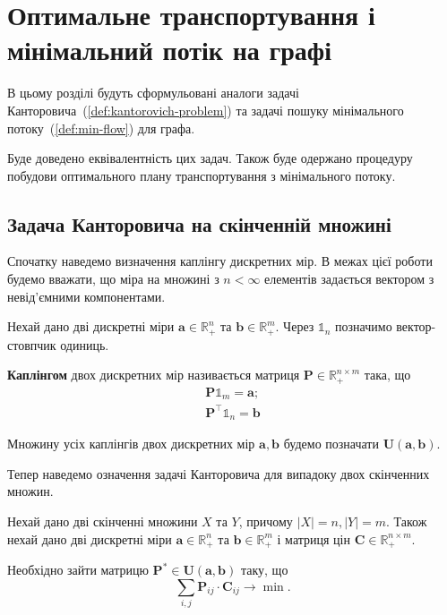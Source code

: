 \chapter{Оптимальне транспортування і мінімальний потік на графі}
\label{chap:graph}

В цьому розділі будуть сформульовані аналоги задачі Канторовича~(\ref{def:kantorovich-problem})
та задачі пошуку мінімального потоку~(\ref{def:min-flow}) для графа.

Буде доведено еквівалентність цих задач. Також буде одержано процедуру побудови
оптимального плану транспортування з мінімального потоку.

\section{Задача Канторовича на скінченній множині}
Спочатку наведемо визначення каплінгу дискретних мір. В межах цієї роботи будемо вважати,
що міра на множині з $n < \infty$ елементів задається вектором з невід'ємними компонентами.

\begin{definition}
    Нехай дано дві дискретні міри $\mathbf a \in \mathbb{R}_+^n$ та $\mathbf b \in \mathbb{R}_+^m$. Через
    $\mathbb{1}_n$ позначимо вектор-стовпчик одиниць.

    \textbf{Каплінгом} двох дискретних мір називається матриця $\mathbf{P} \in \mathbb{R}_{+}^{n \times m}$ така, що
    \begin{eqnarray*}
        \mathbf{P}\mathbb{1}_m = \mathbf a; \\
        \mathbf{P}^\top \mathbb{1}_n = \mathbf b
    \end{eqnarray*}
\end{definition}

Множину усіх каплінгів двох дискретних мір $\mathbf a, \mathbf b$ будемо позначати $\mathbf{U}\left(\mathbf a, \mathbf b\right)$.

Тепер наведемо означення задачі Канторовича для випадоку двох скінченних множин.

\begin{definition}
    \label{def:kantorovich-problem-d}
    Нехай дано дві скінченні множини $X$ та $Y$, причому $|X| = n, |Y| = m$. Також нехай дано дві дискретні міри
    $\mathbf a \in \mathbb{R}_+^n$ та $\mathbf b \in \mathbb{R}_+^m$ і матриця цін $\mathbf{C} \in \mathbb{R}_+^{n \times m}$.

    Необхідно зайти матрицю $\mathbf{P}^* \in \mathbf{U}\left(\mathbf a, \mathbf b\right)$ таку, що
    $$
        \sum_{i, j} \mathbf{P}_{ij} \cdot \mathbf{C}_{ij} \to \min.
    $$
\end{definition}

